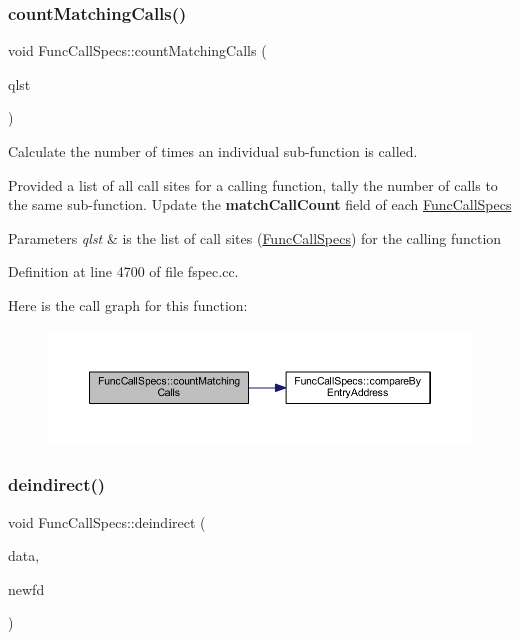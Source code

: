 \subsubsection{\texorpdfstring{countMatchingCalls()}{countMatchingCalls()}}
{\footnotesize\ttfamily void Func\+Call\+Specs\+::count\+Matching\+Calls (\begin{DoxyParamCaption}\item[{const vector$<$ \mbox{\hyperlink{class_func_call_specs}{Func\+Call\+Specs}} $\ast$ $>$ \&}]{qlst }\end{DoxyParamCaption})\hspace{0.3cm}{\ttfamily [static]}}



Calculate the number of times an individual sub-\/function is called. 

Provided a list of all call sites for a calling function, tally the number of calls to the same sub-\/function. Update the {\bfseries{match\+Call\+Count}} field of each \mbox{\hyperlink{class_func_call_specs}{Func\+Call\+Specs}} 
\begin{DoxyParams}{Parameters}
{\em qlst} & is the list of call sites (\mbox{\hyperlink{class_func_call_specs}{Func\+Call\+Specs}}) for the calling function \\
\hline
\end{DoxyParams}


Definition at line 4700 of file fspec.\+cc.

Here is the call graph for this function\+:
\nopagebreak
\begin{figure}[H]
\begin{center}
\leavevmode
\includegraphics[width=350pt]{class_func_call_specs_aab6fc72a11289af288ec65f216d7a45b_cgraph}
\end{center}
\end{figure}
\mbox{\label{class_func_call_specs_aad64d557811baf4602afcefb2746f7be}} 
\subsubsection{\texorpdfstring{deindirect()}{deindirect()}}
{\footnotesize\ttfamily void Func\+Call\+Specs\+::deindirect (\begin{DoxyParamCaption}\item[{\mbox{\hyperlink{class_funcdata}{Funcdata}} \&}]{data,  }\item[{\mbox{\hyperlink{class_funcdata}{Funcdata}} $\ast$}]{newfd }\end{DoxyParamCaption})}



